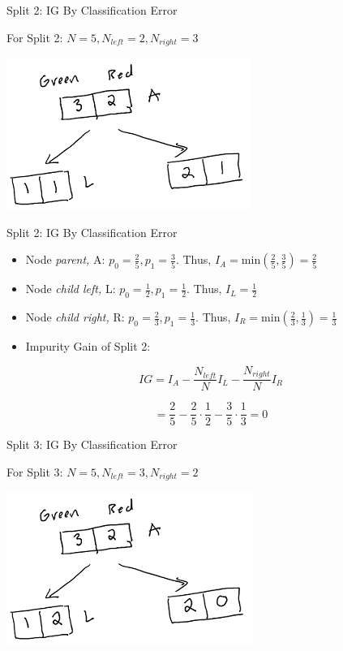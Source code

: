 \documentclass[
  ignorenonframetext,
]{beamer}
\begin{document}
\begin{frame}{Split 2: IG By Classification Error}
\protect\hypertarget{split-2-ig-by-classification-error}{}

For Split 2: \(N = 5, N_{left} =2, N_{right} = 3\)

\includegraphics{images2/im3.png}

\end{frame}

\begin{frame}{Split 2: IG By Classification Error}
\protect\hypertarget{split-2-ig-by-classification-error-1}{}

\begin{itemize}
\item
  Node \emph{parent,} A: \(p_0 = \frac{2}{5}, p_1 = \frac{3}{5}\). Thus,
  \(I_{A} = \text{min}(\frac{2}{5}, \frac{3}{5}) = \frac{2}{5}\)
\item
  Node \emph{child left,} L: \(p_0 = \frac{1}{2}, p_1 = \frac{1}{2}\).
  Thus, \(I_{L} = \frac{1}{2}\)
\item
  Node \emph{child right,} R: \(p_0 = \frac{2}{3}, p_1 = \frac{1}{3}\).
  Thus, \(I_{R} = \text{min}(\frac{2}{3}, \frac{1}{3}) = \frac{1}{3}\)
\item
  Impurity Gain of Split 2:
\end{itemize}

\[
IG = I_{A} - \frac{N_{left}}{N}I_{L}-\frac{N_{right}}{N}I_{R}
\]

\[ = \frac{2}{5} - \frac{2}{5} \cdot \frac{1}{2}-\frac{3}{5} \cdot \frac{1}{3} = 0\]

\end{frame}

\begin{frame}{Split 3: IG By Classification Error}
\protect\hypertarget{split-3-ig-by-classification-error}{}

For Split 3: \(N = 5, N_{left} =3, N_{right} = 2\)

\includegraphics{images2/im2.png}

\end{frame}
\end{document}
